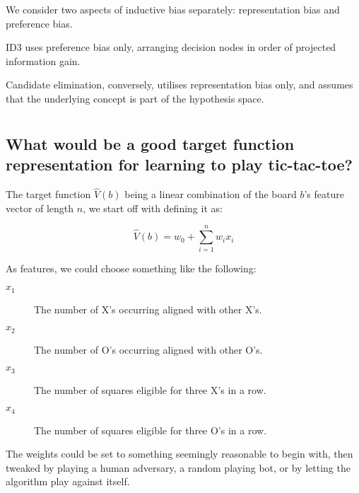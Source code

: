 \documentclass[11pt,a4paper]{article}
\begin{document}
        We consider two aspects of inductive bias separately: representation bias and preference bias.
        
        ID3 uses preference bias only, arranging decision nodes in order of projected information gain.
        
        Candidate elimination, conversely, utilises representation bias only, and assumes that the underlying concept is part of the hypothesis space.
        
    

  
  \section{} %
  \label{sec2}
  
    \subsection{What would be a good target function representation for learning to play tic-tac-toe?} %
    \label{sub:what_would_be_a_good_target_function_representation_for_learning_to_play_tic_tac_toe}
    
      The target function $\hat{V}(b)$ being a linear combination of the board $b$'s feature vector of length $n$, we start off with defining it as:
    
      \begin{equation}
        \hat{V}(b) = w_0 + \sum_{i=1}^n{w_i x_i}
      \end{equation}
    
      As features, we could choose something like the following:
    
      \begin{description}
        \item[$x_1$] The number of X's occurring aligned with other X's.
        \item[$x_2$] The number of O's occurring aligned with other O's.
        \item[$x_3$] The number of squares eligible for three X's in a row.
        \item[$x_4$] The number of squares eligible for three O's in a row.
      \end{description}
    
      The weights could be set to something seemingly reasonable to begin with, then tweaked by playing a human adversary, a random playing bot, or by letting the algorithm play against itself.
    
\end{document}
